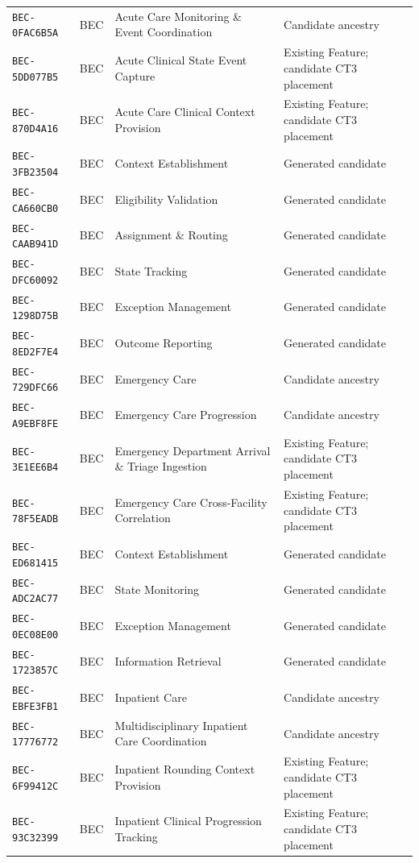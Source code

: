 \documentclass[11pt,a4paper,openany]{book}
\begin{document}
\begin{longtable}{@{}p{.19\linewidth}p{.12\linewidth}p{.39\linewidth}p{.24\linewidth}@{}}
\texttt{BEC-0FAC6B5A} & BEC & Acute Care Monitoring \& Event Coordination & Candidate ancestry \\
\texttt{BEC-5DD077B5} & BEC & Acute Clinical State Event Capture & Existing Feature; candidate CT3 placement \\
\texttt{BEC-870D4A16} & BEC & Acute Care Clinical Context Provision & Existing Feature; candidate CT3 placement \\
\texttt{BEC-3FB23504} & BEC & Context Establishment & Generated candidate \\
\texttt{BEC-CA660CB0} & BEC & Eligibility Validation & Generated candidate \\
\texttt{BEC-CAAB941D} & BEC & Assignment \& Routing & Generated candidate \\
\texttt{BEC-DFC60092} & BEC & State Tracking & Generated candidate \\
\texttt{BEC-1298D75B} & BEC & Exception Management & Generated candidate \\
\texttt{BEC-8ED2F7E4} & BEC & Outcome Reporting & Generated candidate \\
\texttt{BEC-729DFC66} & BEC & Emergency Care & Candidate ancestry \\
\texttt{BEC-A9EBF8FE} & BEC & Emergency Care Progression & Candidate ancestry \\
\texttt{BEC-3E1EE6B4} & BEC & Emergency Department Arrival \& Triage Ingestion & Existing Feature; candidate CT3 placement \\
\texttt{BEC-78F5EADB} & BEC & Emergency Care Cross-Facility Correlation & Existing Feature; candidate CT3 placement \\
\texttt{BEC-ED681415} & BEC & Context Establishment & Generated candidate \\
\texttt{BEC-ADC2AC77} & BEC & State Monitoring & Generated candidate \\
\texttt{BEC-0EC08E00} & BEC & Exception Management & Generated candidate \\
\texttt{BEC-1723857C} & BEC & Information Retrieval & Generated candidate \\
\texttt{BEC-EBFE3FB1} & BEC & Inpatient Care & Candidate ancestry \\
\texttt{BEC-17776772} & BEC & Multidisciplinary Inpatient Care Coordination & Candidate ancestry \\
\texttt{BEC-6F99412C} & BEC & Inpatient Rounding Context Provision & Existing Feature; candidate CT3 placement \\
\texttt{BEC-93C32399} & BEC & Inpatient Clinical Progression Tracking & Existing Feature; candidate CT3 placement \\

\end{longtable}
\end{document}
